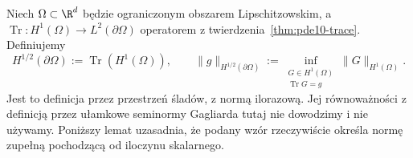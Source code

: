 \begin{definicja}
\label{def:pde10-halftrace}
Niech $\Omega\subset\R^d$ będzie ograniczonym obszarem Lipschitzowskim,
a $\operatorname{Tr}:H^1(\Omega)\to L^2(\partial\Omega)$
operatorem z twierdzenia~\ref{thm:pde10-trace}. Definiujemy
\[
 H^{1/2}(\partial\Omega):=\operatorname{Tr}(H^1(\Omega)),\qquad
 \|g\|_{H^{1/2}(\partial\Omega)}
 :=\inf_{\substack{G\in H^1(\Omega)\\\operatorname{Tr}G=g}}
 \|G\|_{H^1(\Omega)}.
\]
Jest to definicja przez przestrzeń śladów, z normą ilorazową.
Jej równoważności z definicją przez ułamkowe seminormy
Gagliarda tutaj nie dowodzimy i nie używamy.
Poniższy lemat uzasadnia, że podany wzór rzeczywiście
określa normę zupełną pochodzącą od iloczynu skalarnego.
\end{definicja}

